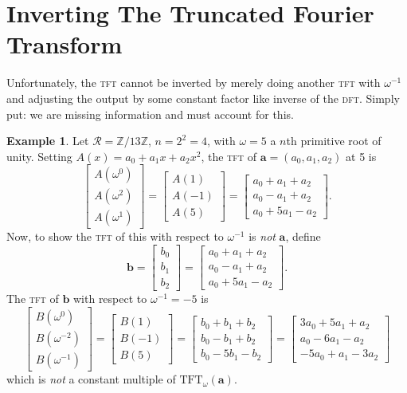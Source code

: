 \documentclass[12pt]{article}
\theoremstyle{definition}
\newcommand{\brac}[1]{\left( #1 \right)}
\newcommand{\sbrac}[1]{\left[ #1 \right]}
\newcommand{\0}{\mathbf{0}}
\newcommand{\ZZ}{\mathbb{Z}}
\theoremstyle{theorem}
\theoremstyle{definition}
\newtheorem*{example}{Example}
\newcommand{\RR}{\mathcal{R}}
\newcommand{\TFT}{\text{TFT}}
\newcommand{\w}{\omega}
\renewcommand{\a}{\mathbf{a}}
\begin{document}
\section{Inverting The Truncated Fourier Transform}\label{Section::InvTFT}
Unfortunately, the \textsc{tft} cannot be inverted by merely doing another \textsc{tft} with $\w^{-1}$ and adjusting the output by some constant factor like inverse of the \textsc{dft}. Simply put: we are missing information and must account for this.

\begin{example}
Let $\RR = \ZZ / 13\ZZ$, $n=2^2=4$, with $\w = 5$ a $n$th primitive root of unity. Setting $A(x) = a_0+a_1x+a_2x^2$, the \textsc{tft} of $\a=(a_0,a_1,a_2)$ at 5 is
$$
\sbrac{\begin{array}{c}
A(\w^0) \\
A(\w^2) \\
A(\w^1)
\end{array}}
= 
\sbrac{\begin{array}{c}
A(1) \\
A(-1) \\
A(5)
\end{array}}
=
\sbrac{\begin{array}{c}
a_0 + a_1 + a_2 \\
a_0 - a_1 + a_2 \\
a_0 + 5a_1 - a_2
\end{array}}.
$$
Now, to show the \textsc{tft} of this with respect to $\w^{-1}$ is \emph{not} $\a$, define 
$$\mathbf{b}
= 
\sbrac{\begin{array}{c}
b_0 \\
b_1 \\
b_2
\end{array}}
=
\sbrac{\begin{array}{c}
a_0 + a_1 +a_2 \\
a_0-a_1+a_2 \\
a_0 + 5a_1 - a_2
\end{array}}.
$$
The \textsc{tft} of $\mathbf{b}$ with respect to $\w^{-1} = -5$ is
$$
\sbrac{\begin{array}{c}
B \brac{\w^0} \\
B \brac{ \w^{-2}} \\
B \brac{ \w^{-1}} 
\end{array}}=
\sbrac{\begin{array}{c}
B(1) \\
B(-1) \\
B(5)
\end{array}}=
\sbrac{\begin{array}{c}
b_0+b_1+b_2 \\
b_0-b_1+b_2 \\
b_0 -5b_1 -b_2
\end{array}}=
\sbrac{\begin{array}{c}
3a_0 + 5a_1 + a_2 \\
a_0 - 6a_1 - a_2 \\
-5a_0 + a_1 - 3a_2
\end{array}}
$$
which is \emph{not} a constant multiple of $\TFT_\w (\a)$.


\end{example}
\end{document}
